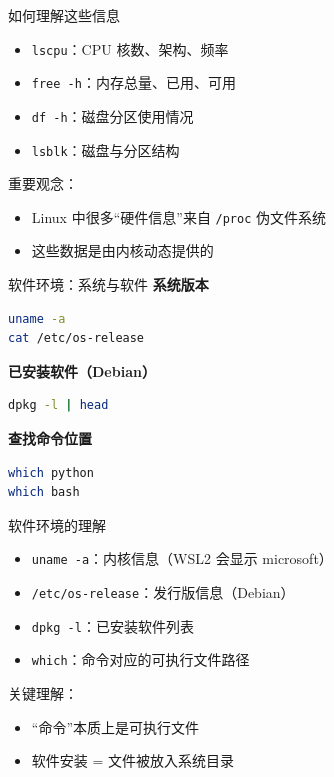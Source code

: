 \documentclass[aspectratio=169]{beamer}
\begin{document}
\begin{frame}{如何理解这些信息}
\begin{itemize}
  \item \texttt{lscpu}：CPU 核数、架构、频率
  \item \texttt{free -h}：内存总量、已用、可用
  \item \texttt{df -h}：磁盘分区使用情况
  \item \texttt{lsblk}：磁盘与分区结构
\end{itemize}

\vspace{0.8em}
重要观念：
\begin{itemize}
  \item Linux 中很多“硬件信息”来自 \texttt{/proc} 伪文件系统
  \item 这些数据是由内核动态提供的
\end{itemize}
\end{frame}

\begin{frame}[fragile]{软件环境：系统与软件}
\textbf{系统版本}
\begin{lstlisting}[language=bash]
uname -a
cat /etc/os-release
\end{lstlisting}

\textbf{已安装软件（Debian）}
\begin{lstlisting}[language=bash]
dpkg -l | head
\end{lstlisting}

\textbf{查找命令位置}
\begin{lstlisting}[language=bash]
which python
which bash
\end{lstlisting}
\end{frame}

\begin{frame}{软件环境的理解}
\begin{itemize}
  \item \texttt{uname -a}：内核信息（WSL2 会显示 microsoft）
  \item \texttt{/etc/os-release}：发行版信息（Debian）
  \item \texttt{dpkg -l}：已安装软件列表
  \item \texttt{which}：命令对应的可执行文件路径
\end{itemize}

\vspace{0.8em}
关键理解：
\begin{itemize}
  \item “命令”本质上是可执行文件
  \item 软件安装 = 文件被放入系统目录
\end{itemize}
\end{frame}
\end{document}
